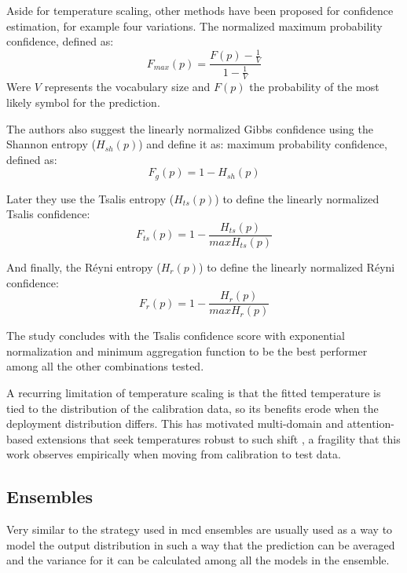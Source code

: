 Aside for temperature scaling, other methods have been proposed for confidence estimation, for example \cite{laptev2023fast} four variations. The normalized maximum probability confidence, defined as:
\begin{equation}\label{ec:eb-nmpc}
   F_{max}(p) = \frac{F(p) - \frac{1}{V}}{1 - \frac{1}{V}}
\end{equation}
Were $V$ represents the vocabulary size and $F(p)$ the probability of the most likely symbol for the prediction.

The authors also suggest the linearly normalized Gibbs confidence using the Shannon entropy ($H_{sh}(p)$) and define it as:
maximum probability confidence, defined as:
\begin{equation}\label{ec:eb-lngc}
   F_{g}(p) = 1 - H_{sh}(p)
\end{equation}

Later they use the Tsalis entropy ($H_{ts}(p)$) to define the linearly normalized Tsalis confidence:
\begin{equation}\label{ec:eb-lntc}
   F_{ts}(p) = 1 - \frac{H_{ts}(p)}{maxH_{ts}(p)}
\end{equation}

And finally, the Réyni entropy ($H_{r}(p)$) to define the linearly normalized Réyni confidence:
\begin{equation}\label{ec:eb-lnrc}
   F_{r}(p) = 1 - \frac{H_{r}(p)}{maxH_{r}(p)}
\end{equation}

The study concludes with the Tsalis confidence score with exponential normalization and minimum aggregation function to be the best performer among all the other combinations tested.

A recurring limitation of temperature scaling is that the fitted temperature is tied to the distribution of the calibration data, so its benefits erode when the deployment distribution differs. This has motivated multi-domain and attention-based extensions that seek temperatures robust to such shift \cite{yu2022robust}\cite{mozafari2018attended}, a fragility that this work observes empirically when moving from calibration to test data.

\subsection{Ensembles}

Very similar to the strategy used in \acrshort{mcd} ensembles are usually used as a way to model the output distribution in such a way that the prediction can be averaged and the variance for it can be calculated among all the models in the ensemble\cite{oneactua2021evaluation}.

